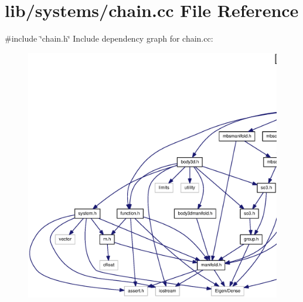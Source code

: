 \section{lib/systems/chain.cc \-File \-Reference}
\label{chain_8cc}
{\ttfamily \#include \char`\"{}chain.\-h\char`\"{}}\*
\-Include dependency graph for chain.\-cc\-:\nopagebreak
\begin{figure}[H]
\begin{center}
\leavevmode
\includegraphics[width=350pt]{chain_8cc__incl}
\end{center}
\end{figure}
